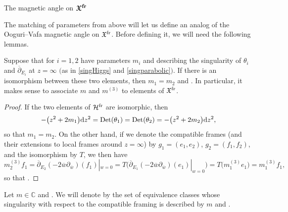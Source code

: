 \begin{subsubsection}{The magnetic angle on $\boldsymbol{\mathfrak{X}^{{\rm fr}}}$}

The matching of parameters from above will let us define an analog of the Ooguri--Vafa magnetic angle on $\mathfrak{X}^{{\rm fr}}$. Before defining it, we will need the following lemmas.

\begin{Lemma}\label{mm3inv} Suppose that  for $i=1,2$ have parameters $m_i$ and  describing the singularity of $\theta_i$ and $\overline{\partial}_{E_i}$ at $z=\infty$ $($as in \eqref{singHiggs} and \eqref{singparabolic}$)$. If there is an isomorphism between these two elements, then $m_1=m_2$ and . In particular, it makes sense to associate $m$ and $m^{(3)}$ to elements of $\mathfrak{X}^{\textnormal{fr}}$.

\end{Lemma}

\begin{proof} If the two elements of $\mathcal{H}^{{\rm fr}}$ are isomorphic, then
\begin{equation*}
-\bigl(z^2+2m_1\bigr){\rm d}z^2=\operatorname{Det}(\theta_1)=\operatorname{Det}(\theta_2)=-\bigl(z^2+2m_2\bigr){\rm d}z^2,
\end{equation*}
so that $m_1=m_2$. On the other hand, if we denote the compatible frames (and their extensions to local frames around $z=\infty$) by $g_1=(e_1,e_2)$, $g_2=(f_1,f_2)$, and the isomorphism by $T$, we then have
\begin{equation*}
 m^{(3)}_2f_1=\overline{\partial}_{E_2}(-2\overline{w}\partial_{\overline{w}})(f_1)|_{w=0}=T\bigl(\overline{\partial}_{E_1}(-2\overline{w}\partial_{\overline{w}})(e_1)|_{w=0}\bigr)
 =T\bigl(m^{(3)}_1e_1\bigr)=m^{(3)}_1f_1,
\end{equation*}
so that .
\end{proof}

\begin{Definition}\label{definition4.1} Let $m\in \mathbb{C}$ and \smash{$m^{(3)}\in \bigl(-\frac12,\frac12\bigr]$}. We will denote by  the set of equivalence classes whose singularity with respect to the compatible framing is described by $m$ and .
\end{Definition}


\end{subsubsection}
